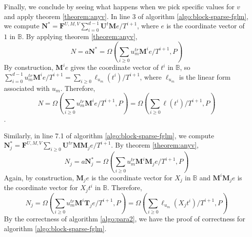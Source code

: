 \documentclass[12pt]{article}
\def\mF{\mathbf{F}}
\def\mM{\mathbf{M}}
\def\mN{\mathbf{N}}
\def\mT{\mathbf{T}}
\def\mU{\mathbf{U}}
\begin{document}
Finally, we conclude by seeing what happens
when we pick specific values for $v$ and apply theorem \ref{theorem:anyv}.
In line 3 of algorithm \ref{algo:block-sparse-fglm}, we compute
$\mN^* = \mF^{U,M,V}\sum_{i=0}^{d-1}\mU^t \mM e/T^{i+1}$, 
where $e$ is the coordinate vector of $1$ in $\mathbb{B}$. By applying theorem \ref{theorem:anyv},
$$N = a\mN^* = \Omega(\sum_{i\ge 0} u_m^{tr} \mM^i e/T^{i+1},P)$$
By construction,
$\mM^i e$ gives the coordinate vector of $t^i$ in $\mathbb{B}$, so
$\sum_{i= 0}^{d-1} u_m^{tr} \mM^i e/T^{i+1} = \sum_{i\ge0} \ell_{u_m}(t^i)/T^{i+1}$, where
$\ell_{u_m}$ is the linear form associated with $u_m$. Therefore, 
$$N = \Omega(\sum_{i\ge 0} u_m^{tr} \mM^i e/T^{i+1},P) = \Omega(\sum_{i\ge 0} \ell(t^i) /T^{i+1},P)$$.

Similarly, in line 7.1 of algorithm \ref{algo:block-sparse-fglm}, we compute
$\mN^*_j = \mF^{U,M,V}\sum_{i\ge0} \mU^{tr} \mM \mM_j e / T^{i+1}$. By theorem \ref{theorem:anyv},
$$N_j = a \mN^*_j = \Omega(\sum_{i\ge 0} u_m^{tr} \mM^i \mM_j e/T^{i+1},P) $$
Again, by construction, $\mM_j e$ is the coordinate vector for $X_j$ in 
$\mathbb{B}$ and $\mM^i \mM_j e$ is the coordinate vector for $X_jt^i$ in
$\mathbb{B}$. Therefore,
$$ N_j =  \Omega(\sum_{i\ge 0} u_m^{tr} \mM^i \mT_j e/T^{i+1},P) =
 \Omega(\sum_{i\ge 0} \ell_{u_m}(X_jt^i)/T^{i+1},P)$$
By the correctness of algorithm \ref{algo:para2}, we have the proof
of correctness for algorithm \ref{algo:block-sparse-fglm}.

\newpage
\end{document}
